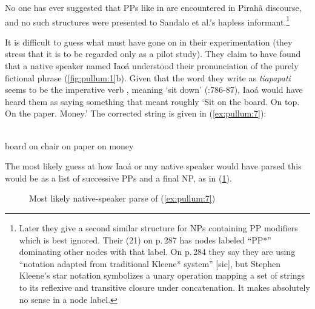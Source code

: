\documentclass[output=paper,colorlinks,citecolor=brown
]{langscibook}
\begin{document}
No one has ever suggested that PPs like in  are encountered 
in Pirah{\~a}
discourse, and no such structures were presented to Sandalo et al.'s
hapless informant.\footnote{%
   Later they give a second similar structure for NPs containing PP
   modifiers which is best ignored. Their (21) on p.\,287 has nodes
   labeled ``PP*'' dominating other nodes with that label. On p.\,284
   they say they are using ``notation adapted from traditional Kleene*
   system'' [sic], but Stephen Kleene's star notation symbolizes a
   unary operation mapping a set of strings to its reflexive and
   transitive closure under concatenation. It makes absolutely no
   sense in a node label.}

It is difficult to guess what must have gone on in their experimentation
(they stress that it is to be regarded only as a pilot study). They claim
to have found that a native speaker named Iao{\'a} understood their
pronunciation of the purely fictional phrase (\ref{fig:pullum:1}b). Given that the word
they write as \textit{tiapapati} seems to be the imperative verb
, meaning `sit down'
(\citealt{EverGibs19}:786-87), Iao{\'a} would have heard them as
saying something that meant roughly `Sit on the board. On top. On
the paper. Money.' The corrected string is given in (\ref{ex:pullum:7}):

\ea
\label{ex:pullum:7}
\gll {}  
      \\
    board on chair on paper on money \\
\z

The most likely guess at how Iao{\'a} or any native speaker would
have parsed this would be as a list of successive PPs and a final NP,
as in (\ref{fig:pullum:3}).

\begin{figure}
    \centering
\quad{}
    \caption{Most likely native-speaker parse of (\ref{ex:pullum:7})}
    \label{fig:pullum:3}
\end{figure}
\end{document}
